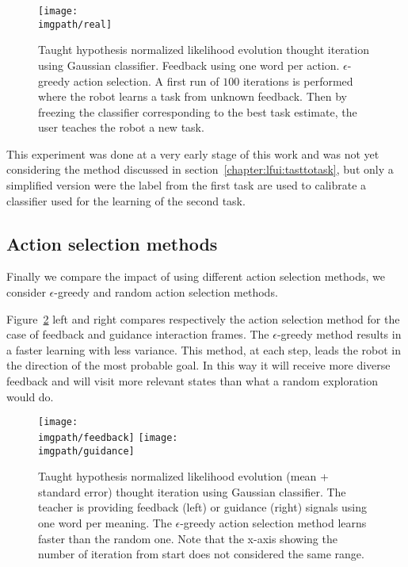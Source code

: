 \begin{figure}[!htbp]
  \centering
  \texttt{[image: \\imgpath/real]}
  \caption{Taught hypothesis normalized likelihood evolution thought iteration using Gaussian classifier.  Feedback using one word per action. $\epsilon$-greedy action selection. A first run of $100$ iterations is performed where the robot learns a task from unknown feedback. Then by freezing the classifier corresponding to the best task estimate, the user teaches the robot a new task.}
  \label{fig:Real}
\end{figure}

This experiment was done at a very early stage of this work and was not yet considering the method discussed in section~\ref{chapter:lfui:tasttotask}, but only a simplified version were the label from the first task are used to calibrate a classifier used for the learning of the second task.

\subsection{Action selection methods}

Finally we compare the impact of using different action selection methods, we consider $\epsilon$-greedy and random action selection methods.

Figure~\ref{fig:selectionMethod} left and right compares respectively the action selection method for the case of feedback and guidance interaction frames. The $\epsilon$-greedy method results in a faster learning with less variance. This method, at each step, leads the robot in the direction of the most probable goal. In this way it will receive more diverse feedback and will visit more relevant states than what a random exploration would do.

\begin{figure}[!htbp]
  \centering
  \texttt{[image: \\imgpath/feedback]}
  \texttt{[image: \\imgpath/guidance]}
  \caption{Taught hypothesis normalized likelihood evolution (mean + standard error) thought iteration using Gaussian classifier. The teacher is providing feedback (left) or guidance (right) signals using one word per meaning. The $\epsilon$-greedy action selection method learns faster than the random one. Note that the x-axis showing the number of iteration from start does not considered the same range.}
  \label{fig:selectionMethod}
\end{figure}


